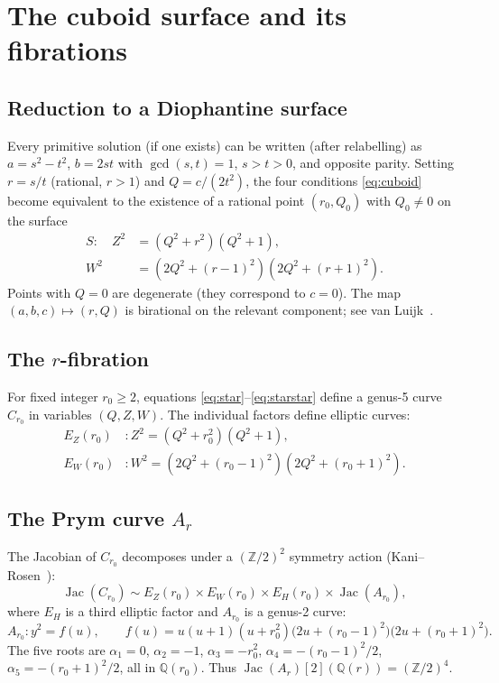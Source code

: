 \documentclass[11pt]{amsart}
\theoremstyle{plain}
\theoremstyle{definition}
\theoremstyle{remark}
\newcommand{\ZZ}{\mathbb{Z}}
\newcommand{\QQ}{\mathbb{Q}}
\newcommand{\Jac}{\operatorname{Jac}}
\begin{document}
\section{The cuboid surface and its fibrations}\label{sec:surface}

\subsection{Reduction to a Diophantine surface}

Every primitive solution (if one exists) can be written
(after relabelling) as $a=s^2-t^2$, $b=2st$ with $\gcd(s,t)=1$,
$s>t>0$, and opposite parity.
Setting $r=s/t$ (rational, $r>1$) and $Q=c/(2t^2)$, the four conditions
\eqref{eq:cuboid} become equivalent to the existence of a rational point
$(r_0,Q_0)$ with $Q_0\ne 0$ on the surface
\begin{align}
  S\colon\quad Z^2 &= (Q^2+r^2)(Q^2+1),  \label{eq:star}\\
                W^2 &= (2Q^2+(r{-}1)^2)(2Q^2+(r{+}1)^2). \label{eq:starstar}
\end{align}
Points with $Q=0$ are degenerate (they correspond to $c=0$).
The map $(a,b,c)\mapsto (r,Q)$ is birational on the relevant component;
see van Luijk~\cite{VanLuijk2000}.

\subsection{The $r$-fibration}

For fixed integer $r_0\ge 2$, equations \eqref{eq:star}--\eqref{eq:starstar}
define a genus-5 curve $C_{r_0}$ in variables $(Q,Z,W)$.
The individual factors define elliptic curves:
\begin{align*}
  E_Z(r_0)&\colon Z^2=(Q^2+r_0^2)(Q^2+1),\\
  E_W(r_0)&\colon W^2=(2Q^2+(r_0{-}1)^2)(2Q^2+(r_0{+}1)^2).
\end{align*}

\subsection{The Prym curve $A_r$}

The Jacobian of $C_{r_0}$ decomposes under a $(\ZZ/2)^2$ symmetry action
(Kani--Rosen~\cite{KaniRosen1989}):
\begin{equation}\label{eq:jac-decomp}
  \Jac(C_{r_0}) \sim E_Z(r_0)\times E_W(r_0)\times E_H(r_0)\times \Jac(A_{r_0}),
\end{equation}
where $E_H$ is a third elliptic factor and $A_{r_0}$ is a genus-2 curve:
\begin{equation}\label{eq:Ar}
  A_{r_0}\colon y^2 = f(u),\qquad
  f(u) = u(u+1)(u+r_0^2)\bigl(2u+(r_0{-}1)^2\bigr)\bigl(2u+(r_0{+}1)^2\bigr).
\end{equation}
The five roots are $\alpha_1=0$, $\alpha_2=-1$, $\alpha_3=-r_0^2$,
$\alpha_4=-(r_0{-}1)^2/2$, $\alpha_5=-(r_0{+}1)^2/2$,
all in $\QQ(r_0)$.  Thus $\Jac(A_r)[2](\QQ(r))=(\ZZ/2)^4$.
\end{document}
